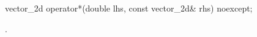\begin{itemdecl}
vector_2d operator*(double lhs, const vector_2d& rhs) noexcept;
\end{itemdecl}
\begin{itemdescr}
	\pnum
	\returns
	.
\end{itemdescr}
